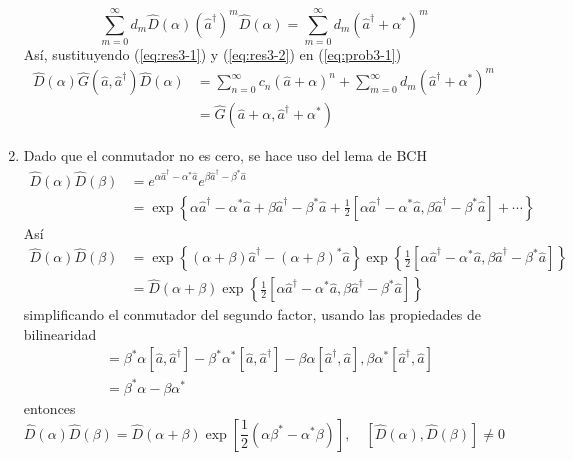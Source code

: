 \begin{enumerate}
\begin{equation}
\sum_{m=0}^{\infty} d_m \hat{D}(\alpha) (\hat{a}^{\dagger})^{m} \hat{D}(\alpha) = \sum_{m=0}^{\infty} d_m \left( \hat{a}^{\dagger} + \alpha^{*} \right)^{m}\label{eq:res3-2}
\end{equation}
Así, sustituyendo (\ref{eq:res3-1}) y (\ref{eq:res3-2}) en (\ref{eq:prob3-1})
\begin{align*}
\hat{D}(\alpha)\hat{G}(\hat{a}, \hat{a}^{\dagger})\hat{D}(\alpha) & = \sum_{n=0}^{\infty} c_n (\hat{a} + \alpha)^{n} + \sum_{m=0}^{\infty} d_m \left( \hat{a}^{\dagger} + \alpha^{*} \right)^{m} \\
& = \hat{G}(\hat{a}+\alpha, \hat{a}^{\dagger} + \alpha^{*})
\end{align*}
\item Dado que el conmutador no es cero, se hace uso del lema de BCH
\begin{align*}
\hat{D}(\alpha)\hat{D}(\beta) & = e^{\alpha\hat{a}^{\dagger} - \alpha^{*}\hat{a}}e^{\beta \hat{a}^{\dagger} - \beta^{*}\hat{a}}                                                                                                  \\
& = \exp{\left\{ \alpha\hat{a}^{\dagger} -\alpha^{*}\hat{a} + \beta\hat{a}^{\dagger} - \beta^{*}\hat{a} + \frac{1}{2}[\alpha\hat{a}^{\dagger} -\alpha^{*}\hat{a},\beta\hat{a}^{\dagger} - \beta^{*}\hat{a}] + \cdots \right\}}
\end{align*}
Así
\begin{align*}
\hat{D}(\alpha)\hat{D}(\beta) & = \exp{\left\{ (\alpha+\beta)\hat{a}^{\dagger} - (\alpha+\beta)^{*}\hat{a} \right\}}\exp{\left\{ \frac{1}{2}[\alpha\hat{a}^{\dagger} -\alpha^{*}\hat{a},\beta\hat{a}^{\dagger} - \beta^{*}\hat{a}] \right\}} \\
& = \hat{D}(\alpha + \beta)\exp{\left\{ \frac{1}{2}[\alpha\hat{a}^{\dagger} -\alpha^{*}\hat{a},\beta\hat{a}^{\dagger} - \beta^{*}\hat{a}] \right\}}
\end{align*}
simplificando el conmutador del segundo factor, usando las propiedades de bilinearidad
\begin{align*}
[\alpha\hat{a}^{\dagger} -\alpha^{*}\hat{a},\beta\hat{a}^{\dagger} - \beta^{*}\hat{a}] & = \beta^{*}\alpha[\hat{a}, \hat{a}^{\dagger}] - \beta^{*}\alpha^{*}[\hat{a}, \hat{a}^{\dagger}] - \beta\alpha[\hat{a}^{\dagger}, \hat{a}], \beta\alpha^*[\hat{a}^{\dagger},\hat{a}] \\
& =\beta^{*}\alpha - \beta\alpha^{*}
\end{align*}
entonces
\begin{equation*}
\hat{D}(\alpha)\hat{D}(\beta) = \hat{D}(\alpha + \beta) \exp{\left[ \frac{1}{2}(\alpha\beta^* - \alpha^*\beta) \right]}, \quad [\hat{D}(\alpha), \hat{D}(\beta)]\neq 0
\end{equation*}


\end{enumerate}
